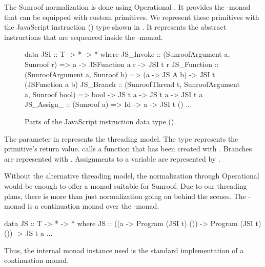 The Sunroof normalization is done using Operational 
\cite{Apfelmus:10:Operational,Hackage:10:Operational}.
It provides the -monad that
can be equipped with custom primitives.
We represent these primitives with the JavaScript instruction
(\JSI)
type shown in . It represents the 
abstract instructions that are sequenced inside 
the -monad.
\begin{figure}[t]
\begin{Code}
data JSI :: T -> * -> * where
  JS_Invoke   :: (SunroofArgument a, Sunroof r) 
              => a -> JSFunction a r -> JSI t r
  JS_Function :: (SunroofArgument a, Sunroof b) 
              => (a -> JS A b) -> JSI t (JSFunction a b)
  JS_Branch   :: (SunroofThread t, SunroofArgument a, Sunroof bool) 
              => bool -> JS t a -> JS t a  -> JSI t a
  JS_Assign_  :: (Sunroof a) => Id -> a -> JSI t ()
  ...
\end{Code}
\caption{Parts of the JavaScript instruction data type (\JSI).}
\label{fig:jsi-definition}
\end{figure}
The parameter  in  represents the threading model.
The type  represents the primitive's return value. 
 calls a function that has been created with .
Branches are represented with . Assignments to a variable
are represented by .

Without the alternative threading model, 
the normalization through Operational
would be enough to offer a monad suitable for Sunroof.
Due to our threading plans, there is more than just 
normalization going on behind the scenes. 
The \JS-monad is a continuation monad over the 
-monad.
\begin{Code}
data JS :: T -> * -> * where
  JS :: ((a -> Program (JSI t) ()) -> Program (JSI t) ()) -> JS t a
  ...
\end{Code}
Thus, the internal monad instance used is the standard implementation of 
a continuation monad.

